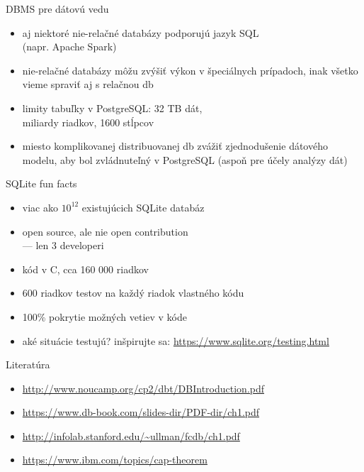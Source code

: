 \documentclass[12pt]{beamer}
\begin{document}
\begin{frame}{DBMS pre dátovú vedu}
\begin{itemize}
\item aj niektoré nie-relačné databázy podporujú jazyk SQL\\
    (napr. Apache Spark)
\item nie-relačné databázy môžu zvýšiť výkon v špeciálnych prípadoch, inak všetko vieme spraviť aj s relačnou db
\item limity tabuľky v PostgreSQL: 32 TB dát,\\ miliardy riadkov, 1600 stĺpcov
\item miesto komplikovanej distribuovanej db zvážiť zjednodušenie dátového modelu, aby bol zvládnuteľný v PostgreSQL (aspoň pre účely analýzy dát)
\end{itemize}
\end{frame}

\begin{frame}{SQLite fun facts}
\begin{itemize}
\item viac ako $10^{12}$ existujúcich SQLite databáz
\item open source, ale nie open contribution\\ --- len 3 developeri
\item kód v C, cca 160 000 riadkov
\item 600 riadkov testov na každý riadok vlastného kódu
\item 100\% pokrytie možných vetiev v kóde
\item aké situácie testujú? inšpirujte sa: \url{https://www.sqlite.org/testing.html}
\end{itemize}
\end{frame}


\begin{frame}{Literatúra}
\begin{itemize}
\item {\scriptsize\url{http://www.noucamp.org/cp2/dbt/DBIntroduction.pdf}}
\item {\scriptsize\url{https://www.db-book.com/slides-dir/PDF-dir/ch1.pdf}}
\item {\scriptsize\url{http://infolab.stanford.edu/~ullman/fcdb/ch1.pdf}}
\item {\scriptsize\url{https://www.ibm.com/topics/cap-theorem}}
\end{itemize}
\end{frame}
\end{document}
